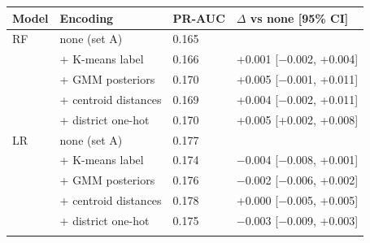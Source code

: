 \begin{tabular}{llll}
\toprule
Model & Encoding & PR-AUC & $\Delta$ vs none [95\% CI] \\
\midrule
RF & none (set A) & 0.165 &  \\
 & + K-means label & 0.166 & +0.001 [$-$0.002, +0.004] \\
 & + GMM posteriors & 0.170 & +0.005 [$-$0.001, +0.011] \\
 & + centroid distances & 0.169 & +0.004 [$-$0.002, +0.011] \\
 & + district one-hot & 0.170 & +0.005 [+0.002, +0.008] \\
\addlinespace[2pt]
LR & none (set A) & 0.177 &  \\
 & + K-means label & 0.174 & $-$0.004 [$-$0.008, +0.001] \\
 & + GMM posteriors & 0.176 & $-$0.002 [$-$0.006, +0.002] \\
 & + centroid distances & 0.178 & +0.000 [$-$0.005, +0.005] \\
 & + district one-hot & 0.175 & $-$0.003 [$-$0.009, +0.003] \\
\addlinespace[2pt]
\bottomrule
\end{tabular}
